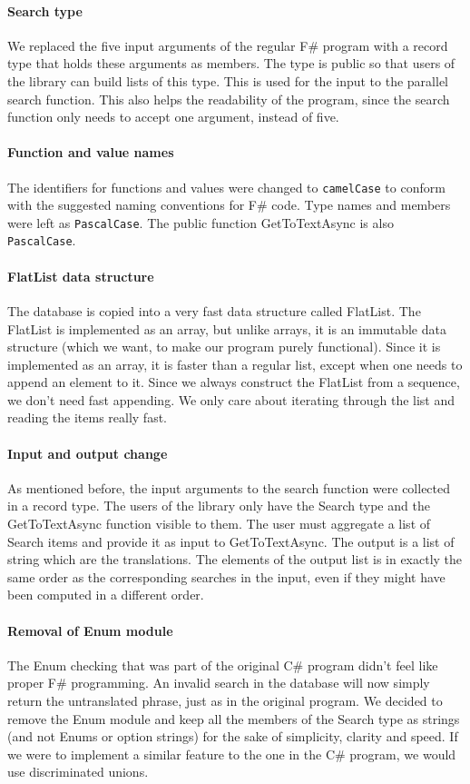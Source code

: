\documentclass[12pt, a4paper]{article}
\newcommand{\code}[1]{{\small \texttt{#1}}}
\begin{document}
\paragraph{Search type} We replaced the five input arguments of the regular F\# program with a record type that holds these arguments as members. The type is public so that users of the library can build lists of this type. This is used for the input to the parallel search function. This also helps the readability of the program, since the search function only needs to accept one argument, instead of five.

\paragraph{Function and value names} The identifiers for functions and values were changed to \code{camelCase} to conform with the suggested naming conventions for F\# code. Type names and members were left as \code{PascalCase}. The public function GetToTextAsync is also \code{PascalCase}.

\paragraph{FlatList data structure} The database is copied into a very fast data structure called FlatList. The FlatList is implemented as an array, but unlike arrays, it is an immutable data structure (which we want, to make our program purely functional). Since it is implemented as an array, it is faster than a regular list, except when one needs to append an element to it. Since we always construct the FlatList from a sequence, we don't need fast appending. We only care about iterating through the list and reading the items really fast.

\paragraph{Input and output change} As mentioned before, the input arguments to the search function were collected in a record type. The users of the library only have the Search type and the GetToTextAsync function visible to them. The user must aggregate a list of Search items and provide it as input to GetToTextAsync. The output is a list of string which are the translations. The elements of the output list is in exactly the same order as the corresponding searches in the input, even if they might have been computed in a different order.

\paragraph{Removal of Enum module} The Enum checking that was part of the original C\# program didn't feel like proper F\# programming. An invalid search in the database will now simply return the untranslated phrase, just as in the original program. We decided to remove the Enum module and keep all the members of the Search type as strings (and not Enums or option strings) for the sake of simplicity, clarity and speed. If we were to implement a similar feature to the one in the C\# program, we would use discriminated unions.
\end{document}
